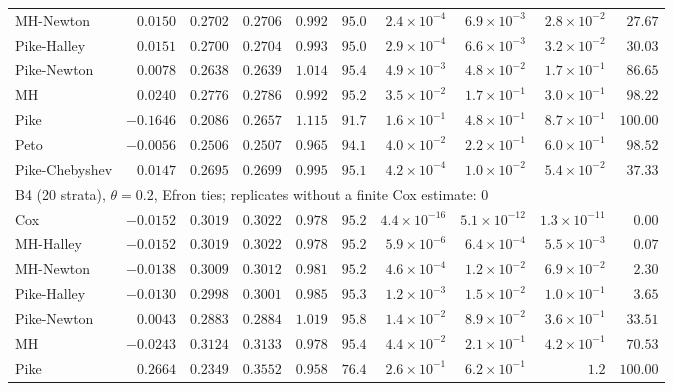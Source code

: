 \begin{landscape}
\begin{longtable}{lrrrrrrrrr}
MH-Newton & $0.0150$ & $0.2702$ & $0.2706$ & $0.992$ & $95.0$ & $2.4 \times 10^{-4}$ & $6.9 \times 10^{-3}$ & $2.8 \times 10^{-2}$ & $27.67$ \\
Pike-Halley & $0.0151$ & $0.2700$ & $0.2704$ & $0.993$ & $95.0$ & $2.9 \times 10^{-4}$ & $6.6 \times 10^{-3}$ & $3.2 \times 10^{-2}$ & $30.03$ \\
Pike-Newton & $0.0078$ & $0.2638$ & $0.2639$ & $1.014$ & $95.4$ & $4.9 \times 10^{-3}$ & $4.8 \times 10^{-2}$ & $1.7 \times 10^{-1}$ & $86.65$ \\
MH & $0.0240$ & $0.2776$ & $0.2786$ & $0.992$ & $95.2$ & $3.5 \times 10^{-2}$ & $1.7 \times 10^{-1}$ & $3.0 \times 10^{-1}$ & $98.22$ \\
Pike & $-0.1646$ & $0.2086$ & $0.2657$ & $1.115$ & $91.7$ & $1.6 \times 10^{-1}$ & $4.8 \times 10^{-1}$ & $8.7 \times 10^{-1}$ & $100.00$ \\
Peto & $-0.0056$ & $0.2506$ & $0.2507$ & $0.965$ & $94.1$ & $4.0 \times 10^{-2}$ & $2.2 \times 10^{-1}$ & $6.0 \times 10^{-1}$ & $98.52$ \\
Pike-Chebyshev & $0.0147$ & $0.2695$ & $0.2699$ & $0.995$ & $95.1$ & $4.2 \times 10^{-4}$ & $1.0 \times 10^{-2}$ & $5.4 \times 10^{-2}$ & $37.33$ \\
\multicolumn{10}{l}{B4 (20 strata), $\theta = 0.2$, Efron ties; replicates without a finite Cox estimate: 0} \\
Cox & $-0.0152$ & $0.3019$ & $0.3022$ & $0.978$ & $95.2$ & $4.4 \times 10^{-16}$ & $5.1 \times 10^{-12}$ & $1.3 \times 10^{-11}$ & $0.00$ \\
MH-Halley & $-0.0152$ & $0.3019$ & $0.3022$ & $0.978$ & $95.2$ & $5.9 \times 10^{-6}$ & $6.4 \times 10^{-4}$ & $5.5 \times 10^{-3}$ & $0.07$ \\
MH-Newton & $-0.0138$ & $0.3009$ & $0.3012$ & $0.981$ & $95.2$ & $4.6 \times 10^{-4}$ & $1.2 \times 10^{-2}$ & $6.9 \times 10^{-2}$ & $2.30$ \\
Pike-Halley & $-0.0130$ & $0.2998$ & $0.3001$ & $0.985$ & $95.3$ & $1.2 \times 10^{-3}$ & $1.5 \times 10^{-2}$ & $1.0 \times 10^{-1}$ & $3.65$ \\
Pike-Newton & $0.0043$ & $0.2883$ & $0.2884$ & $1.019$ & $95.8$ & $1.4 \times 10^{-2}$ & $8.9 \times 10^{-2}$ & $3.6 \times 10^{-1}$ & $33.51$ \\
MH & $-0.0243$ & $0.3124$ & $0.3133$ & $0.978$ & $95.4$ & $4.4 \times 10^{-2}$ & $2.1 \times 10^{-1}$ & $4.2 \times 10^{-1}$ & $70.53$ \\
Pike & $0.2664$ & $0.2349$ & $0.3552$ & $0.958$ & $76.4$ & $2.6 \times 10^{-1}$ & $6.2 \times 10^{-1}$ & $1.2$ & $100.00$ \\

\end{longtable}
\end{landscape}
